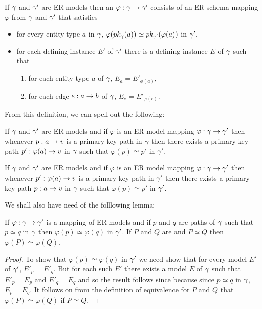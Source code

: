 \begin{definition}
If $\gmodel$ and  $\gmodel'$ are ER models then an 
$\varphi : \gmodel \morph \gmodel'$ consists of an ER schema mapping $\varphi$ from $\gmodel$ and  $\gmodel'$ that satisfies
\begin{itemize}
\item for every entity type $a$ in $\gmodel$, $\varphi(\pk{a}) \simeq \pk[\gmodel']{\varphi(a)}$
in $\gmodel'$,
\item  for each defining instance $E'$  of $\gmodel'$ there is a defining instance $E$ of $\gmodel$ such that
\begin{enumerate}
\item for each entity type $a$ of $\gmodel$, $E_a = E'_{\phi(a)}$,
\item for each edge $e:a \morph b$ of $\gmodel$, $E_e = E'_{\varphi(e)}$.
\end{enumerate} 
\end{itemize}
\end{definition}

From this definition, we can spell out the following:


\begin{observation}
If $\gmodel$ and $\gmodel'$ are ER models and if $\varphi$ is an ER model mapping $\varphi: \gmodel \morph \gmodel'$ then whenever 
$p:a \morph \veee$ is a primary key path in $\gmodel$ then there exists a primary key path 
$p':\varphi(a) \morph \veee$ in $\gmodel$ such that $\varphi(p) \simeq p'$ in $\gmodel'$.
\end{observation}


\begin{observation}
If $\gmodel$ and $\gmodel'$ are ER models and if $\varphi$ is an ER model mapping $\varphi: \gmodel \morph \gmodel'$ then whenever $p':\varphi(a) \morph \veee$ is a primary key path in $\gmodel'$ then there exists a primary key path $p:a \morph \veee$ in $\gmodel$ such that $\varphi(p) \simeq p'$ in $\gmodel'$.
\end{observation}

We shall also have need of the folllowing lemma:
\begin{lemma}
If $\varphi: \gmodel \morph \gmodel'$ is a mapping of ER models and
if $p$ and $q$ are paths of $\gmodel$ such that $p \simeq q$ in $\gmodel$ then $\varphi(p) \simeq \varphi(q)$ in $\gmodel'$. If $P$ and $Q$ are  and $P \simeq Q$ then $\varphi(P) \simeq \varphi(Q)$.
\end{lemma}
\begin{proof}
To show that $\varphi(p) \simeq \varphi(q)$ in $\gmodel'$ we need show that for every model $E'$ of $\gmodel'$, $E'_p=E'_q$. But for each such $E'$ there exists a model $E$ of $\gmodel$ such that $E'_p=E_p$ and $E'_q=E_q$ and so the result follows since because since $p\simeq q$ in $\gmodel$, $E_p=E_q$.
It follows on from the definition of equivalence for   $P$ and $Q$ that $\varphi(P) \simeq \varphi(Q)$ if $P \simeq Q$.
\end{proof}

